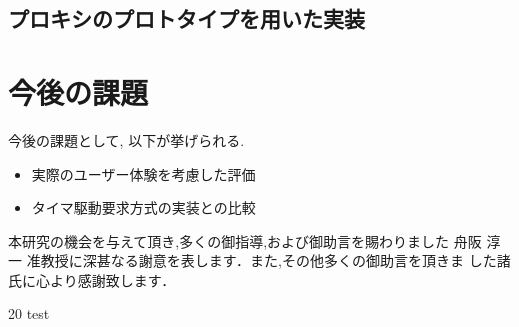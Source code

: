 \documentclass[a4j,12pt]{gradthesis_utf8}
\begin{document}
\newpage

\section{プロキシのプロトタイプを用いた実装}
 
\chapter{今後の課題}\label{sec:sec7}
\hspace*{0.5em}今後の課題として, 以下が挙げられる.
\begin{itemize}
    \item 実際のユーザー体験を考慮した評価
    \item タイマ駆動要求方式の実装との比較
\end{itemize}
\clearpage
%
\begin{acknowledgment}
 本研究の機会を与えて頂き,多くの御指導,および御助言を賜わりました
舟阪 淳一 准教授に深甚なる謝意を表します．また,その他多くの御助言を頂きま
した諸氏に心より感謝致します．
\end{acknowledgment}
\begin {thebibliography}{20} 
 test

\end {thebibliography}
\end{document}
